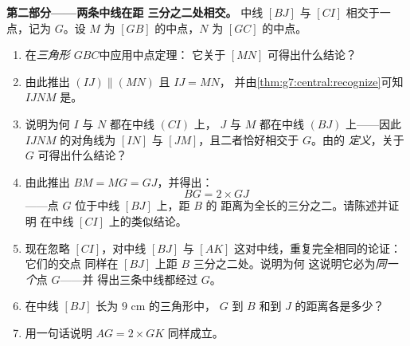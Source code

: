 \begin{problem}
\medskip
\noindent\textbf{第二部分——两条中线在距
三分之二处相交。}
中线 $[BJ]$ 与 $[CI]$ 相交于一点，记为 $G$。设
$M$ 为 $[GB]$ 的中点，$N$ 为 $[GC]$ 的中点。
\begin{enumerate}[resume]
  \item 在\emph{三角形 $GBC$}中应用中点定理：
        它关于 $[MN]$ 可得出什么结论？
  \item 由此推出 $(IJ) \parallel (MN)$ 且 $IJ = MN$，
        并由\cref{thm:g7:central:recognize}可知
         $IJNM$ 是。
  \item 说明为何 $I$ 与 $N$ 都在中线 $(CI)$ 上，
        $J$ 与 $M$ 都在中线 $(BJ)$ 上——因此
         $IJNM$ 的对角线为 $[IN]$ 与
        $[JM]$，且二者恰好相交于 $G$。由的
        \emph{定义}，关于 $G$ 可得出什么结论？
  \item 由此推出 $BM = MG = GJ$，并得出：
        \[
        BG = 2 \times GJ
        \]
——点 $G$ 位于中线 $[BJ]$ 上，距 $B$ 的
        距离为全长的三分之二。请陈述并证明
        在中线 $[CI]$ 上的类似结论。
  \item 现在忽略 $[CI]$，对中线 $[BJ]$ 与 $[AK]$
        这对中线，重复完全相同的论证：它们的交点
        同样在 $[BJ]$ 上距 $B$ 三分之二处。说明为何
        这说明它必为\emph{同一个}点 $G$——并
        得出三条中线都经过 $G$。
  \item 在中线 $[BJ]$ 长为 $9$ cm 的三角形中，
        $G$ 到 $B$ 和到 $J$ 的距离各是多少？
  \item 用一句话说明 $AG = 2 \times GK$ 同样成立。
\end{enumerate}


\end{problem}
